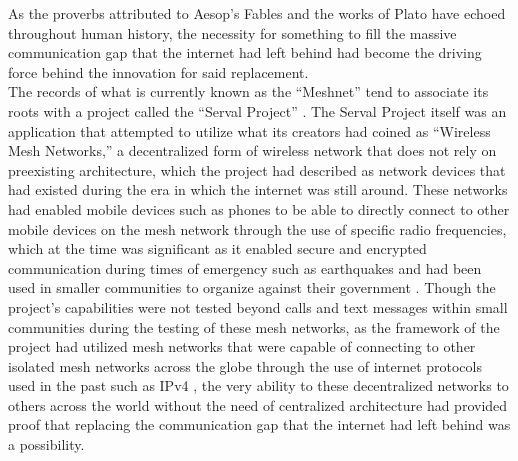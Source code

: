 \documentclass{article}
\theoremstyle{theorem}
\theoremstyle{definition}
\theoremstyle{remark}
\begin{document}
	As the proverbs attributed to Aesop’s Fables and the works of Plato have echoed throughout human history, the necessity for something to fill the massive communication gap that the internet had left behind had become the driving force behind the innovation for said replacement. \\

	The records of what is currently known as the “Meshnet” tend to associate its roots with a project called the “Serval Project” \cite{Tsp}. The Serval Project itself was an application that attempted to utilize what its creators had coined as “Wireless Mesh Networks,” a decentralized form of wireless network that does not rely on preexisting architecture, which the project had described as network devices that had existed during the era in which the internet was still around. These networks had enabled mobile devices such as phones to be able to directly connect to other mobile devices on the mesh network through the use of specific radio frequencies, which at the time was significant as it enabled secure and encrypted communication during times of emergency such as earthquakes and had been used in smaller communities to organize against their government \cite{Tsm}. Though the project’s capabilities were not tested beyond calls and text messages within small communities during the testing of these mesh networks, as the framework of the project had utilized mesh networks that were capable of connecting to other isolated mesh networks across the globe through the use of internet protocols used in the past such as IPv4 \cite{Tsp}, the very ability to these decentralized networks to others across the world without the need of centralized architecture had provided proof that replacing the communication gap that the internet had left behind was a possibility. \\
\end{document}
